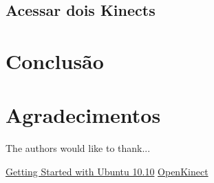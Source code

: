 \documentclass[journal]{IEEEtran}
\begin{document}
\subsection{Acessar dois Kinects}


\section{Conclusão}

\section*{Agradecimentos}


The authors would like to thank...

\begin{thebibliography}{4}
  
 \href{ftp://ftp.fisio.cinvestav.mx/Manuales/linux/Getting\%20Started\%20with\%20Ubuntu\%2010.10.pdf}{Getting Started with Ubuntu 10.10}
 \href{http://openkinect.org/wiki/Main_Page}{OpenKinect}
\end{thebibliography}
\end{document}
